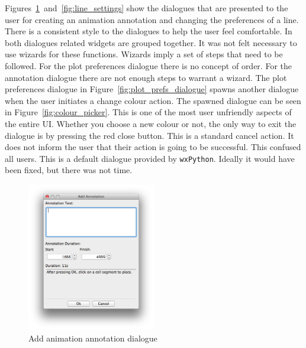 Figures~\ref{fig:add_anime_annotation}~and~\ref{fig:line_settings} show the dialogues that are presented to the user for creating an animation annotation and changing the preferences of a line.  There is a consistent style to the dialogues to help the user feel comfortable.  In both dialogues related widgets are grouped together.  It was not felt necessary to use wizards for these functions.  Wizards imply a set of steps that need to be followed.  For the plot preferences dialogue there is no concept of order.  For the annotation dialogue there are not enough steps to warrant a wizard.  The plot preferences dialogue in Figure~\ref{fig:plot_prefs_dialogue} spawns another dialogue when the user initiates a change colour action.  The spawned dialogue can be seen in Figure~\ref{fig:colour_picker}.  This is one of the most user unfriendly aspects of the entire \ac{UI}.  Whether you choose a new colour or not, the only way to exit the dialogue is by pressing the red close button.  This is a standard cancel action.  It does not inform the user that their action is going to be successful.  This confused all users.  This is a default dialogue provided by \texttt{wxPython}.  Ideally it would have been fixed, but there was not time.

\begin{figure}[h!]
    \centering
    \includegraphics[width=0.5\textwidth]{images/add_annotation_dialogue.png}
    \caption{Add animation annotation dialogue}
    \label{fig:add_anime_annotation}
\end{figure}

